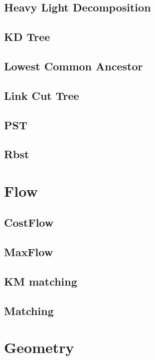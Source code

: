 \subsection{Heavy Light Decomposition}

\subsection{KD Tree}

\subsection{Lowest Common Ancestor}

\subsection{Link Cut Tree}

\subsection{PST}

\subsection{Rbst}


\section{Flow}
\subsection{CostFlow}

\subsection{MaxFlow}

\subsection{KM matching}

\subsection{Matching}


\section{Geometry}
